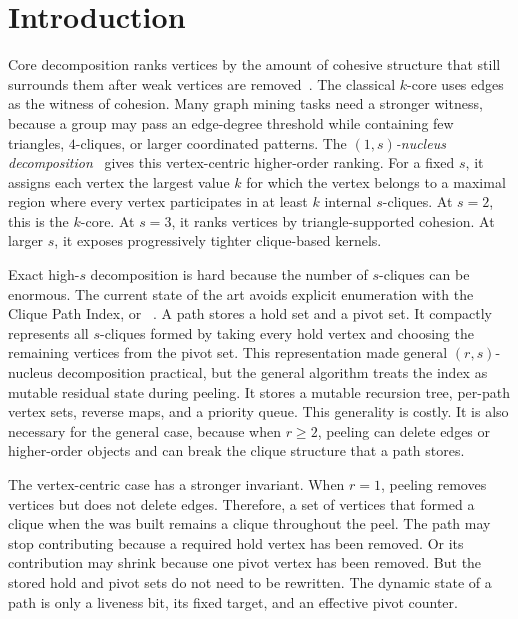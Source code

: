 \section{Introduction}\label{sec:intro}

Core decomposition ranks vertices by the amount of cohesive structure that still surrounds them after weak vertices are removed~\cite{kcoreSeidman,coreAlg,communityFinder}.
%
The classical \(k\)-core uses edges as the witness of cohesion.
%
Many graph mining tasks need a stronger witness, because a group may pass an edge-degree threshold while containing few triangles, \(4\)-cliques, or larger coordinated patterns.
%
The \emph{\((1,s)\)-nucleus decomposition}~\cite{nucleusSariyuce14} gives this vertex-centric higher-order ranking.
%
For a fixed \(s\), it assigns each vertex the largest value \(k\) for which the vertex belongs to a maximal region where every vertex participates in at least \(k\) internal \(s\)-cliques.
%
At \(s=2\), this is the \(k\)-core.
%
At \(s=3\), it ranks vertices by triangle-supported cohesion.
%
At larger \(s\), it exposes progressively tighter clique-based kernels.

Exact high-\(s\) decomposition is hard because the number of \(s\)-cliques can be enormous.
%
The current state of the art avoids explicit enumeration with the Clique Path Index, or \cpi{}~\cite{NuclearCD}.
%
A \cpi{} path stores a hold set and a pivot set.
%
It compactly represents all \(s\)-cliques formed by taking every hold vertex and choosing the remaining vertices from the pivot set.
%
This representation made general \((r,s)\)-nucleus decomposition practical, but the general algorithm treats the index as mutable residual state during peeling.
%
It stores a mutable recursion tree, per-path vertex sets, reverse maps, and a priority queue.
%
This generality is costly.
%
It is also necessary for the general case, because when \(r\ge2\), peeling can delete edges or higher-order objects and can break the clique structure that a path stores.

The vertex-centric case has a stronger invariant.
%
When \(r=1\), peeling removes vertices but does not delete edges.
%
Therefore, a set of vertices that formed a clique when the \cpi{} was built remains a clique throughout the peel.
%
The path may stop contributing because a required hold vertex has been removed.
%
Or its contribution may shrink because one pivot vertex has been removed.
%
But the stored hold and pivot sets do not need to be rewritten.
%
The dynamic state of a path is only a liveness bit, its fixed target, and an effective pivot counter.

